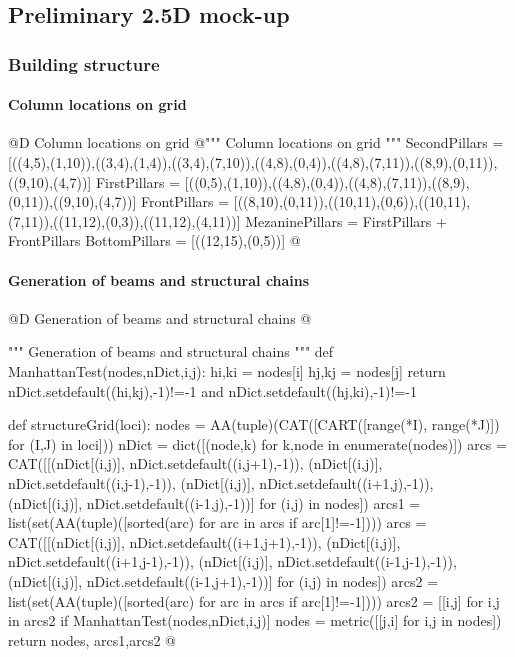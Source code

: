 \documentclass[11pt,oneside]{article}    %
\begin{document}
\subsection{Preliminary 2.5D mock-up}

\subsubsection{Building structure}

\paragraph{Column locations on grid}
@D Column locations on grid 
@{""" Column locations on grid """
SecondPillars = [((4,5),(1,10)),((3,4),(1,4)),((3,4),(7,10)),((4,8),(0,4)),((4,8),(7,11)),((8,9),(0,11)),((9,10),(4,7))]
FirstPillars = [((0,5),(1,10)),((4,8),(0,4)),((4,8),(7,11)),((8,9),(0,11)),((9,10),(4,7))]
FrontPillars = [((8,10),(0,11)),((10,11),(0,6)),((10,11),(7,11)),((11,12),(0,3)),((11,12),(4,11))]
MezaninePillars = FirstPillars + FrontPillars
BottomPillars = [((12,15),(0,5))]
@}

\paragraph{Generation of beams and structural chains}
@D Generation of beams and structural chains 
@{""" Generation of beams and structural chains """
def ManhattanTest(nodes,nDict,i,j):
	hi,ki = nodes[i]
	hj,kj = nodes[j]
	return nDict.setdefault((hi,kj),-1)!=-1 and nDict.setdefault((hj,ki),-1)!=-1

def structureGrid(loci):
    nodes = AA(tuple)(CAT([CART([range(*I), range(*J)]) for (I,J) in loci]))
    nDict = dict([(node,k) for k,node in enumerate(nodes)])
    arcs = CAT([[(nDict[(i,j)], nDict.setdefault((i,j+1),-1)),
             (nDict[(i,j)], nDict.setdefault((i,j-1),-1)),
             (nDict[(i,j)], nDict.setdefault((i+1,j),-1)),
             (nDict[(i,j)], nDict.setdefault((i-1,j),-1))] for (i,j) in nodes])
    arcs1 = list(set(AA(tuple)([sorted(arc) for arc in arcs if arc[1]!=-1])))
    arcs = CAT([[(nDict[(i,j)], nDict.setdefault((i+1,j+1),-1)),
             (nDict[(i,j)], nDict.setdefault((i+1,j-1),-1)),
             (nDict[(i,j)], nDict.setdefault((i-1,j-1),-1)),
             (nDict[(i,j)], nDict.setdefault((i-1,j+1),-1))] for (i,j) in nodes])
    arcs2 = list(set(AA(tuple)([sorted(arc) for arc in arcs if arc[1]!=-1])))
    arcs2 = [[i,j] for i,j in arcs2 if ManhattanTest(nodes,nDict,i,j)]
    nodes = metric([[j,i] for i,j in nodes])
    return nodes, arcs1,arcs2
@}
    
\end{document}
